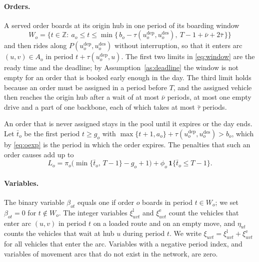 \documentclass[12pt]{article}
\theoremstyle{plain}
\theoremstyle{definition}
\newcommand{\dep}{u^{\mathrm{dep}}}
\newcommand{\des}{u^{\mathrm{des}}}
\begin{document}
\paragraph{Orders.} A served order boards at its origin hub in one period of its boarding window
\begin{equation}\label{eq:window}
W_o=\bigl\{t\in\mathbb{Z}:\ a_o\le t\le\min\{\,b_o-\tau(\dep_o,\des_o),\ T-1+\bar\nu+2\bar\tau\,\}\bigr\}
\end{equation}
and then rides along $P(\dep_o,\des_o)$ without interruption, so that it enters arc $(u,v)\in A_o$ in period $t+\tau(\dep_o,u)$. The first two limits in \eqref{eq:window} are the ready time and the deadline; by Assumption~\ref{as:deadline} the window is not empty for an order that is booked early enough in the day. The third limit holds because an order must be assigned in a period before $T$, and the assigned vehicle then reaches the origin hub after a wait of at most $\bar\nu$ periods, at most one empty drive and a part of one backbone, each of which takes at most $\bar\tau$ periods.

An order that is never assigned stays in the pool until it expires or the day ends. Let $\bar t_o$ be the first period $t\ge g_o$ with $\max\{t+1,a_o\}+\tau(\dep_o,\des_o)>b_o$, which by \eqref{eq:oexp} is the period in which the order expires. The penalties that such an order causes add up to
\begin{equation}\label{eq:loss}
L_o=\pi_o\bigl(\min\{\bar t_o,\,T-1\}-g_o+1\bigr)+\phi_o\,\mathbf{1}\{\bar t_o\le T-1\}.
\end{equation}

\paragraph{Variables.} The binary variable $\beta_{ot}$ equals one if order $o$ boards in period $t\in W_o$; we set $\beta_{ot}=0$ for $t\notin W_o$. The integer variables $\xi^{\mathrm{l}}_{uvt}$ and $\xi^{\mathrm{e}}_{uvt}$ count the vehicles that enter arc $(u,v)$ in period $t$ on a loaded route and on an empty move, and $\eta_{ut}$ counts the vehicles that wait at hub $u$ during period $t$. We write $\xi_{uvt}=\xi^{\mathrm{l}}_{uvt}+\xi^{\mathrm{e}}_{uvt}$ for all vehicles that enter the arc. Variables with a negative period index, and variables of movement arcs that do not exist in the network, are zero.
\end{document}
